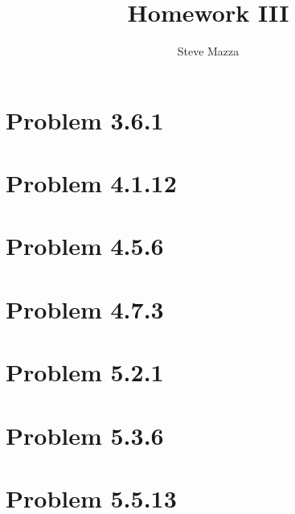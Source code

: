 \documentclass[letterpaper,10pt]{article}
\title{Homework III}
\author{Steve Mazza}
\begin{document}
\maketitle

\section*{Problem 3.6.1}

\section*{Problem 4.1.12}

\section*{Problem 4.5.6}

\section*{Problem 4.7.3}

\section*{Problem 5.2.1}

\section*{Problem 5.3.6}

\section*{Problem 5.5.13}
\end{document}
